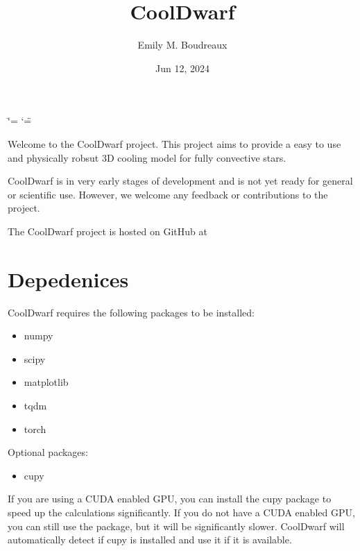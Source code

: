 \documentclass[letterpaper,10pt,english]{sphinxmanual}
\title{CoolDwarf}
\date{Jun 12, 2024}
\author{Emily M.\@{} Boudreaux}
\begin{document}
\ifdefined\shorthandoff
  \ifnum\catcode`\=\string=\active\shorthandoff{=}\fi
  \ifnum\catcode`\"=\active{}\fi
\fi

\pagestyle{empty}
\sphinxmaketitle
\pagestyle{plain}
\sphinxtableofcontents
\pagestyle{normal}
\label{\detokenize{index::doc}}


\sphinxAtStartPar
Welcome to the CoolDwarf project. This project aims to provide a easy to use and physically robsut
3D cooling model for fully convective stars.

\sphinxAtStartPar
CoolDwarf is in very early stages of development and is not yet ready for general or scientific use. However,
we welcome any feedback or contributions to the project.

\sphinxAtStartPar
The CoolDwarf project is hosted on GitHub at 


\chapter{Depedenices}
\label{\detokenize{index:depedenices}}
\sphinxAtStartPar
CoolDwarf requires the following packages to be installed:
\begin{itemize}
\item {} 
\sphinxAtStartPar
numpy

\item {} 
\sphinxAtStartPar
scipy

\item {} 
\sphinxAtStartPar
matplotlib

\item {} 
\sphinxAtStartPar
tqdm

\item {} 
\sphinxAtStartPar
torch

\end{itemize}

\sphinxAtStartPar
Optional packages:
\begin{itemize}
\item {} 
\sphinxAtStartPar
cupy

\end{itemize}

\sphinxAtStartPar
If you are using a CUDA enabled GPU, you can install the cupy package to speed up the calculations
significantly. If you do not have a CUDA enabled GPU, you can still use the package, but it will be
significantly slower. CoolDwarf will automatically detect if cupy is installed and use it if it is available.
\end{document}
